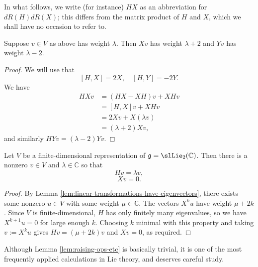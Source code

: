 \documentclass[reqno]{amsart} 
\begin{document}
\begin{remark}
  In what follows,
  we write (for instance) $H X$
  as an abbreviation for
  $d R(H) d R(X)$;
  this differs from the matrix product of
  $H$ and $X$, which we shall have no occasion to refer to.
\end{remark}

\begin{lemma}\label{lem:raising-ops-etc}
  Suppose $v \in V$ as above
  has weight $\lambda$.
  Then $X v$ has weight $\lambda + 2$
  and $Y v$ has weight $\lambda - 2$.
\end{lemma}
\begin{proof}
  We will use that
  \begin{equation*}
    {}    [H,X] = 2 X,
    \quad [H,Y] = - 2 Y.
    \end{equation*}
  We have
  \begin{align*}
    H X v &= (H X - X H) v + X H v \\
          &= [H,X] v + X H v
            \\
          &= 2 X v + X (\lambda  v)
            \\
          &= (\lambda + 2)X v,
  \end{align*}
  and similarly
  $H Y v = (\lambda - 2) Y v$.
\end{proof}

\begin{lemma}
  Let $V$ be a finite-dimensional representation
  of $\mathfrak{g} = \slLie_2(\mathbb{C})$.
  Then there is a nonzero $v \in V$
  and $\lambda \in \mathbb{C}$
  so that
  \begin{equation*}
    H v = \lambda v,
  \end{equation*}
  \begin{equation*}
    X v = 0.
  \end{equation*}
\end{lemma}
\begin{proof}
  By Lemma \ref{lem:linear-transformations-have-eigenvectors},
  there exists some nonzero $u \in V$
  with some weight $\mu \in \mathbb{C}$.
  The vectors $X^k u$ have weight $\mu + 2k$.
  Since $V$ is finite-dimensional,
  $H$ has only finitely many eigenvalues,
  so we have $X^{k+1} u = 0$ for large enough $k$.
  Choosing $k$ minimal with this property
  and taking $v := X^k u$
  gives
  $H v = (\mu + 2 k) v$
  and $X v = 0$, as required.
\end{proof}
\begin{remark}
  Although Lemma \ref{lem:raising-ops-etc} is basically trivial,
  it is one of the most frequently
  applied calculations in Lie theory, and deserves careful study.
\end{remark}
\end{document}
